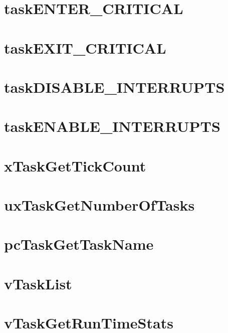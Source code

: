 \documentclass{book}
\begin{document}
\chapter{task\-E\-N\-T\-E\-R\-\_\-\-C\-R\-I\-T\-I\-C\-A\-L}
\label{taskENTER_CRITICAL}
\hypertarget{taskENTER_CRITICAL}{}

\chapter{task\-E\-X\-I\-T\-\_\-\-C\-R\-I\-T\-I\-C\-A\-L}
\label{taskEXIT_CRITICAL}
\hypertarget{taskEXIT_CRITICAL}{}

\chapter{task\-D\-I\-S\-A\-B\-L\-E\-\_\-\-I\-N\-T\-E\-R\-R\-U\-P\-T\-S}
\label{taskDISABLE_INTERRUPTS}
\hypertarget{taskDISABLE_INTERRUPTS}{}

\chapter{task\-E\-N\-A\-B\-L\-E\-\_\-\-I\-N\-T\-E\-R\-R\-U\-P\-T\-S}
\label{taskENABLE_INTERRUPTS}
\hypertarget{taskENABLE_INTERRUPTS}{}

\chapter{x\-Task\-Get\-Tick\-Count}
\label{xTaskGetTickCount}
\hypertarget{xTaskGetTickCount}{}

\chapter{ux\-Task\-Get\-Number\-Of\-Tasks}
\label{uxTaskGetNumberOfTasks}
\hypertarget{uxTaskGetNumberOfTasks}{}

\chapter{pc\-Task\-Get\-Task\-Name}
\label{pcTaskGetTaskName}
\hypertarget{pcTaskGetTaskName}{}

\chapter{v\-Task\-List}
\label{vTaskList}
\hypertarget{vTaskList}{}

\chapter{v\-Task\-Get\-Run\-Time\-Stats}
\label{vTaskGetRunTimeStats}
\hypertarget{vTaskGetRunTimeStats}{}

\end{document}
